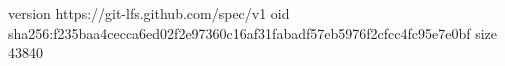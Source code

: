 version https://git-lfs.github.com/spec/v1
oid sha256:f235baa4cecca6ed02f2e97360c16af31fabadf57eb5976f2cfcc4fc95e7e0bf
size 43840
